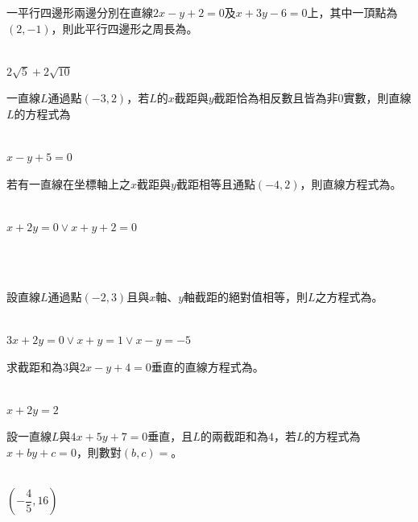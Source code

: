 \documentclass
[answers]
{exam}
\newcommand\ul[1]{\uline{\hspace*{#1}}}
\theoremstyle{definition}
\begin{document}
\begin{questions}
一平行四邊形兩邊分別在直線$2x-y+2=0$及$x+3y-6=0$上，其中一頂點為$\left( 2,-1\right)$，則此平行四邊形之周長為\ul{50pt}。
\\ 
\begin{solution}~\\
	$2\sqrt{5}+2\sqrt{10}$
\end{solution}

\question

一直線$L$通過點$\left( -3,2\right)$，若$L$的$x$截距與$y$截距恰為相反數且皆為非0實數，則直線$L$的方程式為\ul{50pt}
\\ 
\begin{solution}~\\
	$x-y+5=0$
\end{solution}


\question

若有一直線在坐標軸上之$x$截距與$y$截距相等且通點$\left( -4,2\right)$，則直線方程式為\ul{50pt}。
\\ 
\begin{solution}~\\
	$x+2y=0 \vee x+y+2=0$
\end{solution}

$ $\\$ $\\
\question

設直線$L$通過點$\left( -2,3\right)$且與$x$軸、$y$軸截距的絕對值相等，則$L$之方程式為\ul{50pt}。
\\ 
\begin{solution}~\\
	$3x+2y=0 \vee x+y = 1 \vee x - y = -5$
\end{solution}

\question

求截距和為$3$與$2x-y+4=0$垂直的直線方程式為\ul{50pt}。
\\ 
\begin{solution}~\\
	$x+2y = 2$
\end{solution}

\question

設一直線$L$與$4x+5y+7=0$垂直，且$L$的兩截距和為$4$，若$L$的方程式為$x+by+c=0$，則數對$\left( b,c\right)=$\ul{50pt}。
\\ 
\begin{solution}~\\
	$\left( -\dfrac{4}{5},16\right)$
\end{solution}
$ $\\$ $\\$ $\\
\question


\end{questions}
\end{document}
